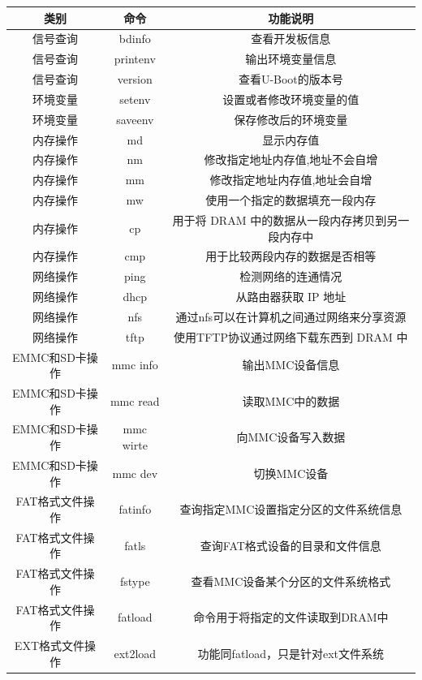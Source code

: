    \begin{table}[!ht]
   	\centering
   	\begin{tabular}{|c|c|c|}
   		\hline
   		\textbf{类别} & \textbf{命令} & \textbf{功能说明} \\
   		\hline
   		信号查询 & bdinfo & 查看开发板信息 \\
   		信号查询 & printenv & 输出环境变量信息 \\
   		信号查询 & version & 查看U-Boot的版本号 \\
   		环境变量 & setenv & 设置或者修改环境变量的值 \\
   		环境变量 & saveenv & 保存修改后的环境变量 \\
   		内存操作 & md & 显示内存值\\
   		内存操作 & nm & 修改指定地址内存值,地址不会自增\\
   		内存操作 & mm & 修改指定地址内存值,地址会自增\\
   		内存操作 & mw & 使用一个指定的数据填充一段内存\\
   		内存操作 & cp & 用于将 DRAM 中的数据从一段内存拷贝到另一段内存中\\
   		内存操作 & cmp & 用于比较两段内存的数据是否相等\\
        网络操作 & ping & 检测网络的连通情况 \\
        网络操作 & dhcp & 从路由器获取 IP 地址 \\
        网络操作 & nfs & 通过nfs可以在计算机之间通过网络来分享资源 \\
        网络操作 & tftp & 使用TFTP协议通过网络下载东西到 DRAM 中\\
        EMMC和SD卡操作 & mmc info & 输出MMC设备信息 \\
        EMMC和SD卡操作 & mmc read & 读取MMC中的数据 \\
        EMMC和SD卡操作 & mmc wirte & 向MMC设备写入数据 \\
        EMMC和SD卡操作 & mmc dev & 切换MMC设备 \\
        FAT格式文件操作 & fatinfo & 查询指定MMC设置指定分区的文件系统信息 \\
        FAT格式文件操作 & fatls & 查询FAT格式设备的目录和文件信息 \\
        FAT格式文件操作 & fstype & 查看MMC设备某个分区的文件系统格式 \\
        FAT格式文件操作 & fatload & 命令用于将指定的文件读取到DRAM中 \\
        EXT格式文件操作 & ext2load & 功能同fatload，只是针对ext文件系统 \\

\end{tabular}
\end{table}
